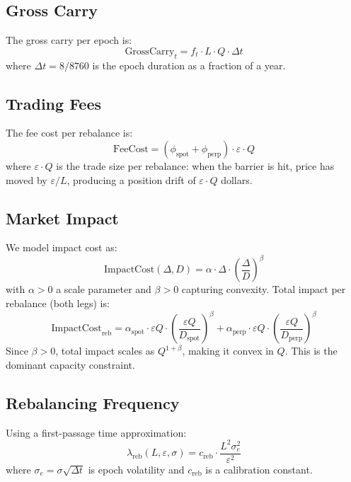 \documentclass[11pt]{article}
\begin{document}
\subsection{Gross Carry}

The gross carry per epoch is:
\begin{equation}
\text{GrossCarry}_t = f_t \cdot L \cdot Q \cdot \Delta t
\end{equation}
where $\Delta t = 8/8760$ is the epoch duration as a fraction of a year.

\subsection{Trading Fees}

The fee cost per rebalance is:
\begin{equation}
\text{FeeCost} = (\phi_{\text{spot}} + \phi_{\text{perp}}) \cdot \varepsilon \cdot Q
\end{equation}
where $\varepsilon \cdot Q$ is the trade size per rebalance: when the barrier is hit, price has moved by $\varepsilon/L$, producing a position drift of $\varepsilon \cdot Q$ dollars.

\subsection{Market Impact}

We model impact cost as:
\begin{equation}
\text{ImpactCost}(\Delta, D) = \alpha \cdot \Delta \cdot \left(\frac{\Delta}{D}\right)^\beta
\end{equation}
with $\alpha > 0$ a scale parameter and $\beta > 0$ capturing convexity. Total impact per rebalance (both legs) is:
\begin{equation}
\text{ImpactCost}_{\text{reb}} = \alpha_{\text{spot}} \cdot \varepsilon Q \cdot \left(\frac{\varepsilon Q}{D_{\text{spot}}}\right)^\beta + \alpha_{\text{perp}} \cdot \varepsilon Q \cdot \left(\frac{\varepsilon Q}{D_{\text{perp}}}\right)^\beta
\end{equation}
Since $\beta > 0$, total impact scales as $Q^{1+\beta}$, making it convex in $Q$. This is the dominant capacity constraint.

\subsection{Rebalancing Frequency}

Using a first-passage time approximation:
\begin{equation}
\lambda_{\text{reb}}(L, \varepsilon, \sigma) = c_{\text{reb}} \cdot \frac{L^2 \sigma_e^2}{\varepsilon^2}
\end{equation}
where $\sigma_e = \sigma \sqrt{\Delta t}$ is epoch volatility and $c_{\text{reb}}$ is a calibration constant.
\end{document}
